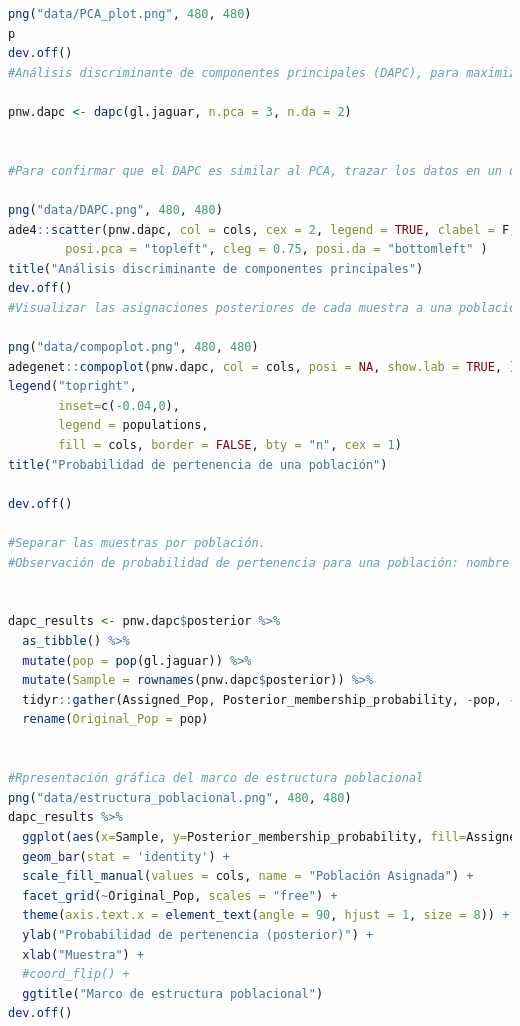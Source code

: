 \documentclass{article}
\begin{document}
\begin{lstlisting}[language=R]
png("data/PCA_plot.png", 480, 480)
p
dev.off()
#Análisis discriminante de componentes principales (DAPC), para maximizar la varianza entre poblaciones.

pnw.dapc <- dapc(gl.jaguar, n.pca = 3, n.da = 2)


#Para confirmar que el DAPC es similar al PCA, trazar los datos en un diagrama de dispersión.

png("data/DAPC.png", 480, 480)
ade4::scatter(pnw.dapc, col = cols, cex = 2, legend = TRUE, clabel = F, posi.leg = "topright", scree.pca = TRUE,
        posi.pca = "topleft", cleg = 0.75, posi.da = "bottomleft" )
title("Análisis discriminante de componentes principales")
dev.off()
#Visualizar las asignaciones posteriores de cada muestra a una población, a traves del diagrama compuesto de barras apiladas.

png("data/compoplot.png", 480, 480)
adegenet::compoplot(pnw.dapc, col = cols, posi = NA, show.lab = TRUE, )
legend("topright",
       inset=c(-0.04,0),
       legend = populations,
       fill = cols, border = FALSE, bty = "n", cex = 1)
title("Probabilidad de pertenencia de una población")

dev.off()

#Separar las muestras por población.
#Observación de probabilidad de pertenencia para una población: nombre de la muestra, la población original y la población asignada


dapc_results <- pnw.dapc$posterior %>% 
  as_tibble() %>% 
  mutate(pop = pop(gl.jaguar)) %>% 
  mutate(Sample = rownames(pnw.dapc$posterior)) %>% 
  tidyr::gather(Assigned_Pop, Posterior_membership_probability, -pop, -Sample) %>% 
  rename(Original_Pop = pop) 
  

#Rpresentación gráfica del marco de estructura poblacional
png("data/estructura_poblacional.png", 480, 480)
dapc_results %>% 
  ggplot(aes(x=Sample, y=Posterior_membership_probability, fill=Assigned_Pop)) +
  geom_bar(stat = 'identity') +
  scale_fill_manual(values = cols, name = "Población Asignada") +
  facet_grid(~Original_Pop, scales = "free") +
  theme(axis.text.x = element_text(angle = 90, hjust = 1, size = 8)) + 
  ylab("Probabilidad de pertenencia (posterior)") +
  xlab("Muestra") + 
  #coord_flip() +
  ggtitle("Marco de estructura poblacional")
dev.off()
\end{lstlisting}



\end{document}
